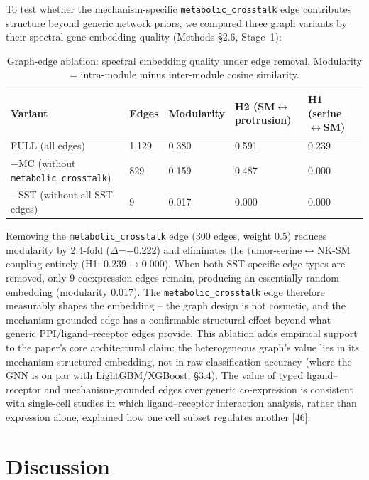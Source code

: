 \documentclass[modern,large,numbered,nocrop]{oup-authoring-template}
\begin{document}
To test whether the mechanism-specific \texttt{metabolic\_crosstalk} edge contributes structure beyond generic network priors, we compared three graph variants by their spectral gene embedding quality (Methods \S{}2.6, Stage~1):

\begin{table}[htbp]
\centering
\caption{Graph-edge ablation: spectral embedding quality under edge removal. Modularity = intra-module minus inter-module cosine similarity.}\label{tab:ablation}
\footnotesize
\begin{tabularx}{\textwidth}{@{}lXXXXX@{}}
\toprule
Variant & Edges & Modularity & H2 (SM$\leftrightarrow$protrusion) & H1 (serine$\leftrightarrow$SM) \\
\midrule
FULL (all edges) & 1,129 & 0.380 & 0.591 & 0.239 \\
$-$MC (without \texttt{metabolic\_crosstalk}) & 829 & 0.159 & 0.487 & 0.000 \\
$-$SST (without all SST edges) & 9 & 0.017 & 0.000 & 0.000 \\
\bottomrule
\end{tabularx}
\end{table}

Removing the \texttt{metabolic\_crosstalk} edge (300 edges, weight 0.5) reduces modularity by 2.4-fold ($\Delta$=$-$0.222) and eliminates the tumor-serine$\leftrightarrow$NK-SM coupling entirely (H1: 0.239$\to$0.000). When both SST-specific edge types are removed, only 9 coexpression edges remain, producing an essentially random embedding (modularity 0.017). The \texttt{metabolic\_crosstalk} edge therefore measurably shapes the embedding -- the graph design is not cosmetic, and the mechanism-grounded edge has a confirmable structural effect beyond what generic PPI/ligand--receptor edges provide. This ablation adds empirical support to the paper's core architectural claim: the heterogeneous graph's value lies in its mechanism-structured embedding, not in raw classification accuracy (where the GNN is on par with LightGBM/XGBoost; \S{}3.4). The value of typed ligand--receptor and mechanism-grounded edges over generic co-expression is consistent with single-cell studies in which ligand--receptor interaction analysis, rather than expression alone, explained how one cell subset regulates another [46].

\section{Discussion}
\end{document}
